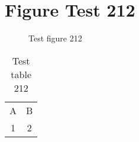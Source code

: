 \documentclass{article}
\begin{document}
\section{Figure Test 212}
\begin{figure}[h]
\caption{Test figure 212}
\end{figure}
\begin{table}[h]
\caption{Test table 212}
\begin{tabular}{cc}
A & B \\
1 & 2
\end{tabular}
\end{table}
\end{document}
